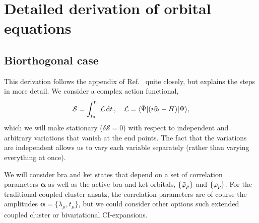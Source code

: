 \documentclass[aip,jcp,preprint,superscriptaddress,nofootinbib]{revtex4-1}
\begin{document}
\section{Detailed derivation of orbital equations}
\subsection{Biorthogonal case}
This derivation follows the appendix of Ref.~
quite closely, but explains the steps in more detail. We consider a complex
action functional,
\begin{align}
    \mathcal{S} = \int_{t_0}^{t_1} \mathcal{L} \dd{t}, \quad \mathcal{L} = \langle \tilde{\Psi} \vert (i \partial_t - H) \vert \Psi \rangle,
\end{align}
which we will make stationary ($\delta \mathcal{S} = 0$) with respect to independent
and arbitrary variations that vanish at the end points. The fact that
the variations are independent allows us to vary each variable separately
(rather than varying everything at once).

We will consider bra and ket states that depend on a set of correlation
parameters $\bm{\alpha}$ as well as the active bra and ket orbitals,
$\{ \tilde{\varphi}_{p} \}$ and $\{ \varphi_{p} \}$. For the traditional coupled cluster
ansatz, the correlation parameters are of course the amplitudes
$\bm{\alpha} = \{ \lambda_\mu, t_\mu \}$, but we could consider
other options such extended coupled cluster or bivariational CI-expansions.
\end{document}
